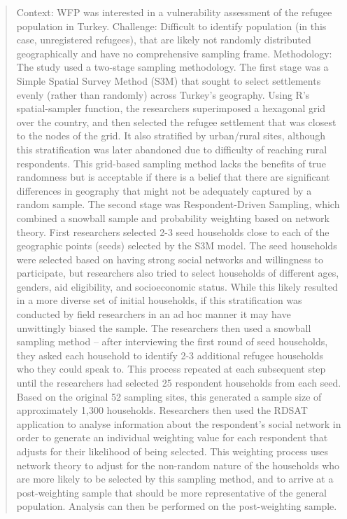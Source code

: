 \documentclass[
]{article}
\begin{document}
\begin{quote}
Context: WFP was interested in a vulnerability assessment of the refugee population in Turkey.
Challenge: Difficult to identify population (in this case, unregistered refugees), that are likely not randomly distributed geographically and have no comprehensive sampling frame.
Methodology: The study used a two-stage sampling methodology.
The first stage was a Simple Spatial Survey Method (S3M) that sought to select settlements evenly (rather than randomly) across Turkey's geography. Using R's spatial-sampler function, the researchers superimposed a hexagonal grid over the country, and then selected the refugee settlement that was closest to the nodes of the grid. It also stratified by urban/rural sites, although this stratification was later abandoned due to difficulty of reaching rural respondents. This grid-based sampling method lacks the benefits of true randomness but is acceptable if there is a belief that there are significant differences in geography that might not be adequately captured by a random sample.
The second stage was Respondent-Driven Sampling, which combined a snowball sample and probability weighting based on network theory. First researchers selected 2-3 seed households close to each of the geographic points (seeds) selected by the S3M model. The seed households were selected based on having strong social networks and willingness to participate, but researchers also tried to select households of different ages, genders, aid eligibility, and socioeconomic status. While this likely resulted in a more diverse set of initial households, if this stratification was conducted by field researchers in an ad hoc manner it may have unwittingly biased the sample. The researchers then used a snowball sampling method -- after interviewing the first round of seed households, they asked each household to identify 2-3 additional refugee households who they could speak to. This process repeated at each subsequent step until the researchers had selected 25 respondent households from each seed. Based on the original 52 sampling sites, this generated a sample size of approximately 1,300 households.
Researchers then used the RDSAT application to analyse information about the respondent's social network in order to generate an individual weighting value for each respondent that adjusts for their likelihood of being selected. This weighting process uses network theory to adjust for the non-random nature of the households who are more likely to be selected by this sampling method, and to arrive at a post-weighting sample that should be more representative of the general population. Analysis can then be performed on the post-weighting sample.

\end{quote}
\end{document}
